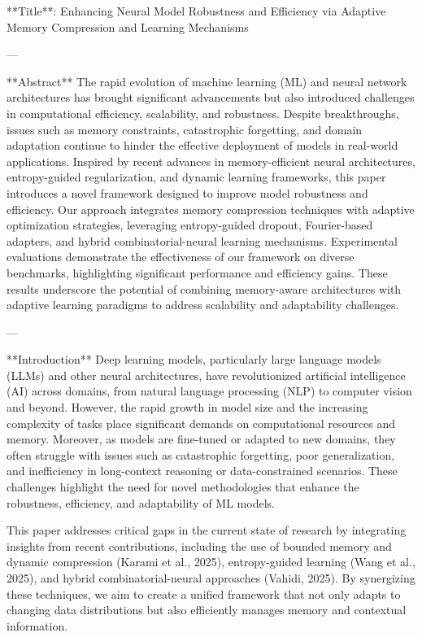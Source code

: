 **Title**: Enhancing Neural Model Robustness and Efficiency via Adaptive Memory Compression and Learning Mechanisms  

---

**Abstract**  
The rapid evolution of machine learning (ML) and neural network architectures has brought significant advancements but also introduced challenges in computational efficiency, scalability, and robustness. Despite breakthroughs, issues such as memory constraints, catastrophic forgetting, and domain adaptation continue to hinder the effective deployment of models in real-world applications. Inspired by recent advances in memory-efficient neural architectures, entropy-guided regularization, and dynamic learning frameworks, this paper introduces a novel framework designed to improve model robustness and efficiency. Our approach integrates memory compression techniques with adaptive optimization strategies, leveraging entropy-guided dropout, Fourier-based adapters, and hybrid combinatorial-neural learning mechanisms. Experimental evaluations demonstrate the effectiveness of our framework on diverse benchmarks, highlighting significant performance and efficiency gains. These results underscore the potential of combining memory-aware architectures with adaptive learning paradigms to address scalability and adaptability challenges.  

---

**Introduction**  
Deep learning models, particularly large language models (LLMs) and other neural architectures, have revolutionized artificial intelligence (AI) across domains, from natural language processing (NLP) to computer vision and beyond. However, the rapid growth in model size and the increasing complexity of tasks place significant demands on computational resources and memory. Moreover, as models are fine-tuned or adapted to new domains, they often struggle with issues such as catastrophic forgetting, poor generalization, and inefficiency in long-context reasoning or data-constrained scenarios. These challenges highlight the need for novel methodologies that enhance the robustness, efficiency, and adaptability of ML models.

This paper addresses critical gaps in the current state of research by integrating insights from recent contributions, including the use of bounded memory and dynamic compression (Karami et al., 2025), entropy-guided learning (Wang et al., 2025), and hybrid combinatorial-neural approaches (Vahidi, 2025). By synergizing these techniques, we aim to create a unified framework that not only adapts to changing data distributions but also efficiently manages memory and contextual information.  

